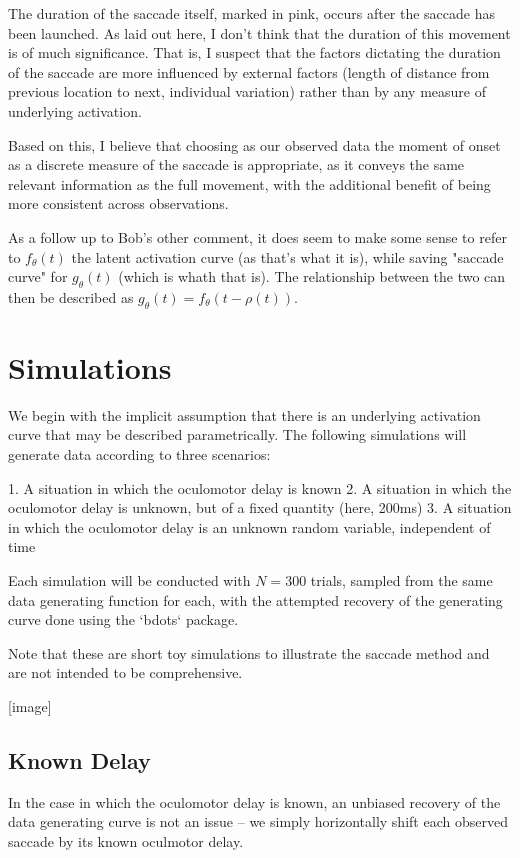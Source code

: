 \documentclass{article}
\begin{document}
The duration of the saccade itself, marked in pink, occurs after the saccade has been launched. As laid out here, I don't think that the duration of this movement is of much significance. That is, I suspect that the factors dictating the duration of the saccade are more influenced by external factors (length of distance from previous location to next, individual variation) rather than by any measure of underlying activation.

Based on this, I believe that choosing as our observed data the moment of onset as a discrete measure of the saccade is appropriate, as it conveys the same relevant information as the full movement, with the additional benefit of being more consistent across observations.

As a follow up to Bob's other comment, it does seem to make some sense to refer to $f_{\theta}(t)$ the latent activation curve (as that's what it is), while saving "saccade curve" for $g_{\theta}(t)$ (which is whath that is). The relationship between the two can then be described as $g_{\theta}(t) = f_{\theta}(t-\rho(t))$.


\section{Simulations}


We begin with the implicit assumption that there is an underlying activation curve that may be described parametrically. The following simulations will generate data according to three scenarios:

1. A situation in which the oculomotor delay is known
2. A situation in which the oculomotor delay is unknown, but of a fixed quantity (here, 200ms)
3. A situation in which the oculomotor delay is an unknown random variable, independent of time

Each simulation will be conducted with $N = 300$ trials, sampled from the same data generating function for each, with the attempted recovery of the generating curve done using the `bdots` package. 

Note that these are short toy simulations to illustrate the saccade method and are not intended to be comprehensive. 

[image]

\subsection{Known Delay}


In the case in which the oculomotor delay is known, an unbiased recovery of the data generating curve is not an issue -- we simply horizontally shift each observed saccade by its known oculmotor delay.
\end{document}
